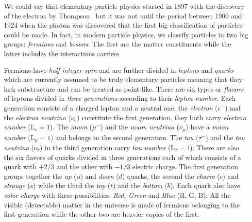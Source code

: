 We could say that elementary particle physics started in 1897 with the discovery
of the electron by Thompson~\cite{ThompsonBook} but it was not until the period
between 1900 and 1924 when the photon was discovered that the first big
classification of particles could be made. In fact, in modern particle physics,
we classify particles in two big groups: \emph{fermions} and \emph{bosons}. The
first are the matter constituents while the latter includes the interactions
carriers.

Fermions have \emph{half integer spin} and are further divided in \emph{leptons}
and \emph{quarks} which are currently assumed to be truly elementary particles
meaning that they lack substructure and can be treated as point-like. There are
six types or \emph{flavors} of leptons divided in \emph{three generations}
according to their \emph{lepton number}. Each generation consists of a charged
lepton and a neutral one, the \emph{electron} ($e^-$) and the \emph{electron
  neutrino} ($\nu_e$) constitute the first generation, they both carry
\emph{electron number} (L$_e = 1$). The \emph{muon} ($\mu^-$) and the \emph{muon
  neutrino} ($\nu_\mu$) have a \emph{muon number} (L$_\mu = 1$) and belongs to
the second generation. The \emph{tau} ($\tau^-$) and the \emph{tau neutrino}
($\nu_\tau$) in the third generation carry \emph{tau number} (L$_\tau =
1$). There are also the six flavors of quarks divided in three generations each
of which consists of a quark with $+2/3$ and the other with $-1/3$ electric
charge. The first generation groups together the \emph{up} ($u$) and \emph{down}
($d$) quarks, the second the \emph{charm} ($c$) and \emph{strange} ($s$) while
the third the \emph{top} ($t$) and the \emph{bottom} ($b$). Each quark also have
\emph{color charge} with three possibilities: \emph{Red, Green} and \emph{Blue}
(R, G, B). All the visible (detectable) matter in the universe is made of
fermions belonging to the first generation while the other two are heavier
copies of the first.

